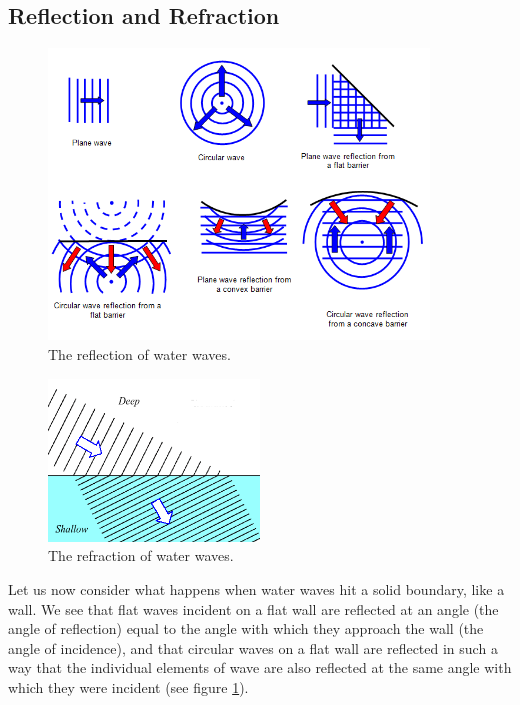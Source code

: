 \documentclass[a4paper]{amsbook}
\newcommand\capcite[1]{}
\begin{document}
\subsection{Reflection and Refraction}
\begin{figure}
  \centering
  \includegraphics[width=0.9\textwidth]{waterreflect}
  \caption{The reflection of water waves. \capcite{http://www.schoolphysics.co.uk/age16-19/Wave\%20properties/Wave\%20properties/text/Wave_reflection_and_refraction/images/1.png}\label{fig:watreflect}}
\end{figure}
\begin{figure}
  \centering
  \includegraphics[width=0.5\textwidth]{refraction}
  \caption{The refraction of water waves. \capcite{http://www.school-for-champions.com/science/images/waves_obstacles_refraction.gif}\label{fig:refraction}}
\end{figure}
Let us now consider what happens when water waves hit a solid boundary, like a wall. We see that flat waves incident on a flat wall are reflected
at an angle (the angle of reflection) equal to the angle with which they approach the wall (the angle of incidence), and that circular waves
on a flat wall are reflected in such a way that the individual elements of wave are also reflected at the same angle with which they were incident
(see figure \ref{fig:watreflect}).
\end{document}
